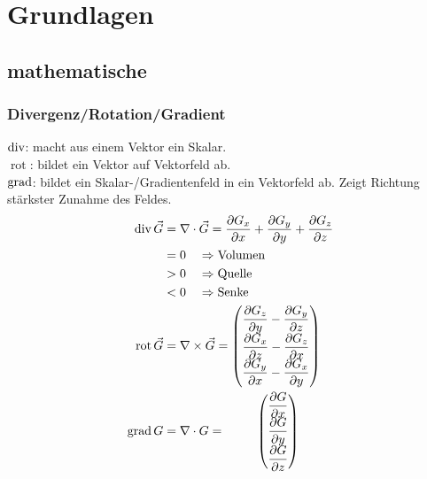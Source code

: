 \section{Grundlagen}
\subsection{mathematische}
\subsubsection*{Divergenz/Rotation/Gradient}

$\operatorname{div}$: macht aus einem Vektor ein Skalar.\\
$\operatorname{rot}$: bildet ein Vektor auf Vektorfeld ab.\\
$\operatorname{grad}$: bildet ein Skalar-/Gradientenfeld in ein Vektorfeld ab.
Zeigt Richtung stärkster Zunahme des Feldes.
\begin{align*}
    \operatorname{div} \vec{G}             & = \nabla \cdot \vec{G} = \dfrac{\partial G_x}{\partial x} + \dfrac{\partial G_y}{\partial y} + \dfrac{\partial G_z}{\partial z} \\
                               & = 0 \quad\Rightarrow \textnormal{Volumen}                                                                                       \\
                               & > 0 \quad\Rightarrow \textnormal{Quelle}                                                                                        \\
                               & < 0 \quad\Rightarrow \textnormal{Senke}                                                                                         \\
    \operatorname{rot} \vec{G} & = \nabla \times \vec{G} =
    \begin{pmatrix}
        \dfrac{\partial G_z}{\partial y} - \dfrac{\partial G_y}{\partial z} \\
        \dfrac{\partial G_x}{\partial z} - \dfrac{\partial G_z}{\partial x} \\
        \dfrac{\partial G_y}{\partial x} - \dfrac{\partial G_x}{\partial y}
    \end{pmatrix}                                                                                          \\
    \operatorname{grad} G                  & = \nabla \cdot G = \hspace{6ex}
    \begin{pmatrix}
        \dfrac{\partial G}{\partial x} \\
        \dfrac{\partial G}{\partial y} \\
        \dfrac{\partial G}{\partial z}
    \end{pmatrix}
\end{align*}

